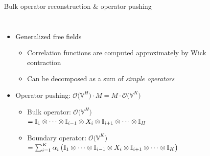 \documentclass{fdubeamer}
\begin{document}
\begin{frame}{Bulk operator reconstruction \& operator pushing}

\begin{columns}[c]


    \begin{itemize}
      \item Generalized free fields

        \begin{itemize}
          \item Correlation functions are computed approximately by Wick contraction
          \item Can be decomposed as a sum of \emph{simple operators}
        \end{itemize}

      \item Operator pushing: $\mathcal{O} \bigl( \mathbb{V}^H \bigr) \cdot M = M \cdot \mathcal{O} \bigl( \mathbb{V}^K \bigr)$
        \begin{itemize}
          \item Bulk operator: $\mathcal{O} \bigl( \mathbb{V}^H \bigr)$ \\
            \mbox{\quad}
            $
              = \mathbb{I}_1 \otimes \cdots \otimes \mathbb{I}_{i-1} \otimes X_i \otimes \mathbb{I}_{i+1} \otimes \dots \otimes \mathbb{I}_{H}
            $
          \item Boundary operator: $\mathcal{O} \bigl( \mathbb{V}^K \bigr)$ \\
            \mbox{\quad}
            $
              = \sum_{i=1}^K \alpha_i \, \bigl(
                  \mathbb{I}_1 \otimes \cdots \otimes \mathbb{I}_{i-1} \otimes X_i \otimes \mathbb{I}_{i+1} \otimes \dots \otimes \mathbb{I}_{K}
                \bigr)
            $
        \end{itemize}
    \end{itemize}


    \begin{center}
      \scriptsize
      \tikzset{x=1em, y=1em, node font=\tiny}
    \end{center}

\end{columns}


\end{frame}
\end{document}
